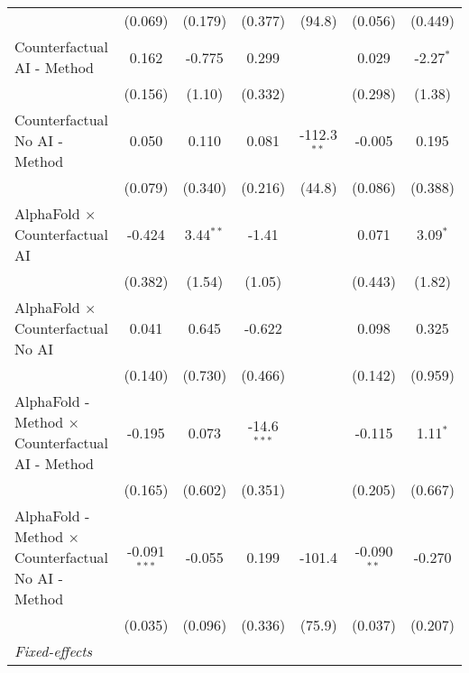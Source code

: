 \begin{tabular}{lcccccc}
                                                              & (0.069)        & (0.179)      & (0.377)       & (94.8)        & (0.056)       & (0.449)\\   
   Counterfactual AI - Method                                 & 0.162          & -0.775       & 0.299         &               & 0.029         & -2.27$^{*}$\\   
                                                              & (0.156)        & (1.10)       & (0.332)       &               & (0.298)       & (1.38)\\   
   Counterfactual No AI - Method                              & 0.050          & 0.110        & 0.081         & -112.3$^{**}$ & -0.005        & 0.195\\   
                                                              & (0.079)        & (0.340)      & (0.216)       & (44.8)        & (0.086)       & (0.388)\\   
   AlphaFold $\times$ Counterfactual AI                       & -0.424         & 3.44$^{**}$  & -1.41         &               & 0.071         & 3.09$^{*}$\\   
                                                              & (0.382)        & (1.54)       & (1.05)        &               & (0.443)       & (1.82)\\   
   AlphaFold $\times$ Counterfactual No AI                    & 0.041          & 0.645        & -0.622        &               & 0.098         & 0.325\\   
                                                              & (0.140)        & (0.730)      & (0.466)       &               & (0.142)       & (0.959)\\   
   AlphaFold - Method $\times$ Counterfactual AI - Method     & -0.195         & 0.073        & -14.6$^{***}$ &               & -0.115        & 1.11$^{*}$\\   
                                                              & (0.165)        & (0.602)      & (0.351)       &               & (0.205)       & (0.667)\\   
   AlphaFold - Method $\times$ Counterfactual No AI - Method  & -0.091$^{***}$ & -0.055       & 0.199         & -101.4        & -0.090$^{**}$ & -0.270\\   
                                                              & (0.035)        & (0.096)      & (0.336)       & (75.9)        & (0.037)       & (0.207)\\   
   \midrule
   \emph{Fixed-effects}\\

\end{tabular}
